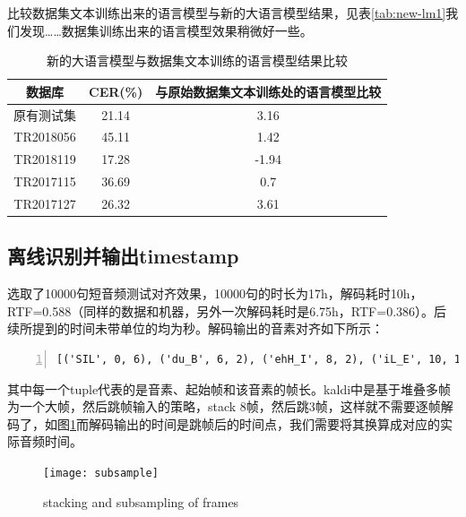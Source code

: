 比较数据集文本训练出来的语言模型与新的大语言模型结果，见表\ref{tab:new-lm1}我们发现……数据集训练出来的语言模型效果稍微好一些。
\begin{table}[h]
 \centering
 \caption{新的大语言模型与数据集文本训练的语言模型结果比较}
	 \begin{tabular*}{1\textwidth}{@{\extracolsep{\fill}}ccc}
	 \toprule
		{\bf 数据库   }  &  {\bf CER(\%)    } & {\bf 与原始数据集文本训练处的语言模型比较} \\
	 \midrule
		 原有测试集 & 21.14   & 3.16 \\
		 TR2018056 & 45.11   & 1.42  \\
		 TR2018119 & 17.28   & -1.94 \\
		 TR2017115 & 36.69   & 0.7   \\
		 TR2017127 & 26.32   & 3.61  \\
	 \bottomrule
	 \end{tabular*}%
 \label{tab:new-lm}%
\end{table}%

\subsection{离线识别并输出timestamp}
选取了10000句短音频测试对齐效果，10000句的时长为17h，解码耗时10h，RTF=0.588（同样的数据和机器，另外一次解码耗时是6.75h，RTF=0.386）。后续所提到的时间未带单位的均为秒。解码输出的音素对齐如下所示：
\begin{lstlisting}[language=shell, numbers=left, 
         numberstyle=\tiny,keywordstyle=\color{blue!70},
         commentstyle=\color{red!50!green!50!blue!50},frame=shadowbox,
         rulesepcolor=\color{red!20!green!20!blue!20},basicstyle=\ttfamily]
[('SIL', 0, 6), ('du_B', 6, 2), ('ehH_I', 8, 2), ('iL_E', 10, 1), ('wu_B', 11, 1), ('oL_I', 12, 1), ('oL_I', 13, 1), ('m_I', 14, 1), ('elM_I', 15, 3), ('nnM_E', 18, 1), ('m_B', 19, 1), ('ehL_I', 20, 2), ('iH_I', 22, 2), ('yi_I', 24, 1), ('oL_I', 25, 1), ('uL_E', 26, 2), ('n_B', 28, 1), ('aH_I', 29, 2), ('aL_I', 31, 1), ('g_I', 32, 4), ('elM_I', 36, 1), ('elM_E', 37, 1), ('SIL', 38, 2), ('ji_B', 40, 2), ('iH_I', 42, 2), ('iH_I', 44, 1), ('ji_I', 45, 3), ('iH_I', 48, 2), ('nnH_E', 50, 4), ('SIL', 54, 9)]
\end{lstlisting}

其中每一个tuple代表的是音素、起始帧和该音素的帧长。kaldi中是基于堆叠多帧为一个大帧，然后跳帧输入的策略，stack 8帧，然后跳3帧，这样就不需要逐帧解码了，如图\ref{fig:subsample}而解码输出的时间是跳帧后的时间点，我们需要将其换算成对应的实际音频时间。
\begin{figure}[!ht]
	\centering
	\texttt{[image: subsample]}
	\caption{stacking and subsampling of frames}
\label{fig:subsample}
\end{figure}

